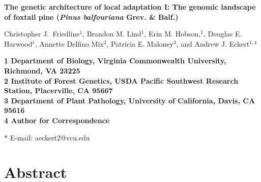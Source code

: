 \documentclass[11pt]{article}
\begin{document}
\begin{flushleft} 
\singlespacing
{\Large \textbf{The genetic architecture of local adaptation I: The genomic landscape of 
foxtail pine (\textit{Pinus balfouriana} Grev. \& Balf.)}}
\null

Christopher J.\ Friedline$^{1}$, 
Brandon M. Lind$^{1}$,
Erin M. Hobson,$^{1}$,
Douglas E. Harwood$^{1}$, 
Annette Delfino Mix$^{2}$,
Patricia E. Maloney$^{3}$, and
Andrew J. Eckert$^{1,4}$
\null

\bf{1} Department of Biology, Virginia Commonwealth University, Richmond, VA 23225
\\
\bf{2} Institute of Forest Genetics, USDA Pacific Southwest Research Station, Placerville, 
CA 95667
\\
\bf{3} Department of Plant Pathology, University of California, Davis, CA 95616
\\
\bf{4} Author for Correspondence
\null

$\ast$ E-mail: aeckert2@vcu.edu
\end{flushleft}

\section*{Abstract}
\end{document}
